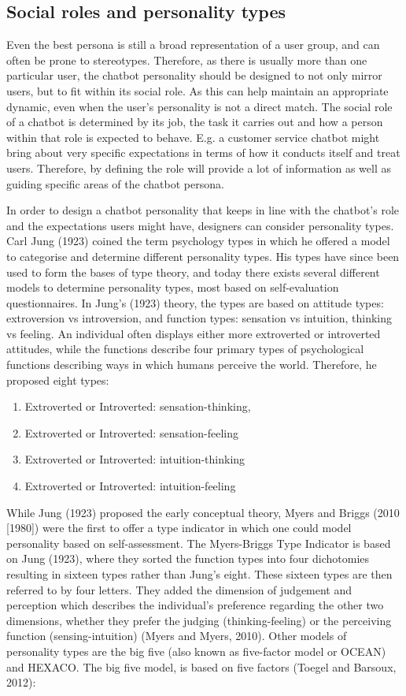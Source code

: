 \subsection{Social roles and personality types}
Even the best persona is still a broad representation of a user group, and can often be prone to stereotypes. Therefore, as there is usually more than one particular user, the chatbot personality should be designed to not only mirror users, but to fit within its social role. As this can help maintain an appropriate dynamic, even when the user's personality is not a direct match. The social role of a chatbot is determined by its job, the task it carries out and how a person within that role is expected to behave. E.g. a customer service chatbot might bring about very specific expectations in terms of how it conducts itself and treat users. Therefore, by defining the role will provide a lot of information as well as guiding specific areas of the chatbot persona.

In order to design a chatbot personality that keeps in line with the chatbot's role and the expectations users might have, designers can consider personality types. Carl Jung (1923) coined the term psychology types in which he offered a model to categorise and determine different personality types. His types have since been used to form the bases of type theory, and today there exists several different models to determine personality types, most based on self-evaluation questionnaires. In Jung's (1923) theory, the types are based on attitude types: extroversion vs introversion, and function types: sensation vs intuition, thinking vs feeling. An individual often displays either more extroverted or introverted attitudes, while the functions describe four primary types of psychological functions describing ways in which humans perceive the world. Therefore, he proposed eight types:

\begin{enumerate}
    \item Extroverted or Introverted: sensation-thinking, 
    \item Extroverted or Introverted: sensation-feeling
    \item Extroverted or Introverted: intuition-thinking
    \item Extroverted or Introverted: intuition-feeling
\end{enumerate}

While Jung (1923) proposed the early conceptual theory, Myers and Briggs (2010 [1980]) were the first to offer a type indicator in which one could model personality based on self-assessment. The Myers-Briggs Type Indicator is based on Jung (1923), where they sorted the function types into four dichotomies resulting in sixteen types rather than Jung's eight. These sixteen types are then referred to by four letters. They added the dimension of judgement and perception which describes the individual's preference regarding the other two dimensions, whether they prefer the judging (thinking-feeling) or the perceiving function (sensing-intuition) (Myers and Myers, 2010). Other models of personality types are the big five (also known as five-factor model or OCEAN) and HEXACO. The big five model, is based on five factors (Toegel and Barsoux, 2012):

